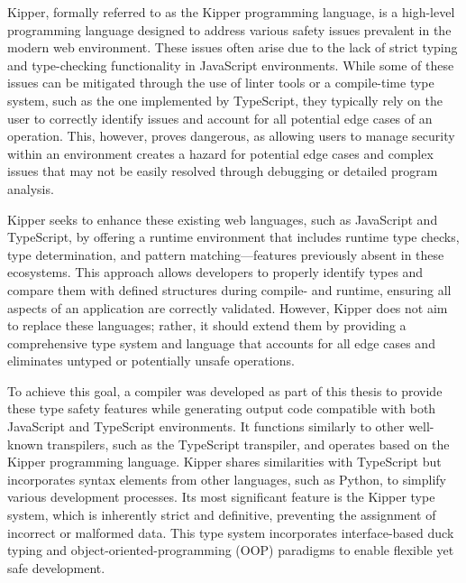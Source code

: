Kipper, formally referred to as the Kipper programming language, is a high-level programming language designed to address various safety issues prevalent in the modern web environment. These issues often arise due to the lack of strict typing and type-checking functionality in JavaScript environments. While some of these issues can be mitigated through the use of linter tools or a compile-time type system, such as the one implemented by TypeScript, they typically rely on the user to correctly identify issues and account for all potential edge cases of an operation. This, however, proves dangerous, as allowing users to manage security within an environment creates a hazard for potential edge cases and complex issues that may not be easily resolved through debugging or detailed program analysis.

Kipper seeks to enhance these existing web languages, such as JavaScript and TypeScript, by offering a runtime environment that includes runtime type checks, type determination, and pattern matching—features previously absent in these ecosystems. This approach allows developers to properly identify types and compare them with defined structures during compile- and runtime, ensuring all aspects of an application are correctly validated. However, Kipper does not aim to replace these languages; rather, it should extend them by providing a comprehensive type system and language that accounts for all edge cases and eliminates untyped or potentially unsafe operations.

To achieve this goal, a compiler was developed as part of this thesis to provide these type safety features while generating output code compatible with both JavaScript and TypeScript environments. It functions similarly to other well-known \gls{transpiler}s, such as the TypeScript transpiler, and operates based on the Kipper programming language. Kipper shares similarities with TypeScript but incorporates syntax elements from other languages, such as Python, to simplify various development processes. Its most significant feature is the Kipper type system, which is inherently strict and definitive, preventing the assignment of incorrect or malformed data. This type system incorporates interface-based duck typing and \gls{object-oriented-programming} (OOP) paradigms to enable flexible yet safe development.

